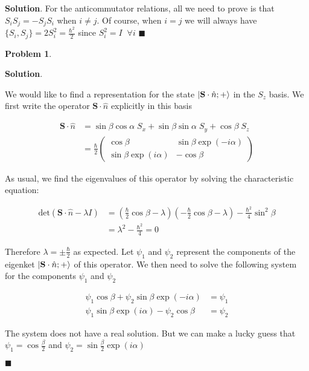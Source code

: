 \documentclass[12pt]{article}
\newtheorem{p}{Problem}
\theoremstyle{definition}
\newenvironment{s}{%
        \begin{trivlist} \item \textbf{Solution}. }{%
            \hspace*{\fill} $\blacksquare$\end{trivlist}}%
\begin{document}
{\begin{s}
For the anticommutator relations, all we need to prove is that $S_{i}S_{j} = -S_{j}S_{i}$ when $i\neq j$. Of course, when $i=j$ we will always have $\{S_{i},S_{j}\} = 2S_{i}^{2} = \frac{\hbar^{2}}{2}$ since $S_{i}^{2} = I \;\;\forall i$
\end{s}

\begin{p}

\end{p}

\begin{s} 

We would like to find a representation for the state $\ket{\mathbf{S}\cdot\hat{n}; +}$ in the $S_{z}$ basis. We first write the operator $\mathbf{S}\cdot\hat{n}$ explicitly in this basis

\begin{align*}
\mathbf{S}\cdot\hat{n} &= \sin\beta\cos\alpha \; S_{x} +\sin\beta\sin\alpha\;S_{y} + \cos\beta\; S_{z}\\
&= \frac{\hbar}{2}\begin{pmatrix}
\cos\beta & \sin\beta\exp(-i\alpha)\\
\sin\beta\exp(i\alpha) & -\cos\beta
\end{pmatrix}
\end{align*}

As usual, we find the eigenvalues of this operator by solving the characteristic equation:

\begin{align*}
\mathrm{det}\left(\mathbf{S}\cdot\hat{n} - \lambda I\right) &= \left(\frac{\hbar}{2}\cos\beta - \lambda\right)\left(-\frac{\hbar}{2}\cos\beta - \lambda\right) - \frac{\hbar^{2}}{4}\sin^{2}\beta\\
&= \lambda^{2} - \frac{\hbar^{2}}{4} = 0
\end{align*}

Therefore $\lambda = \pm \frac{\hbar}{2}$ as expected. Let $\psi_{1}$ and $\psi_{2}$ represent the components of the eigenket $\ket{\mathbf{S}\cdot\hat{n}; +}$ of this operator. We then need to solve the following system for the components $\psi_{1}$ and $\psi_{2}$

\begin{align*}
\psi_{1}\cos\beta+\psi_{2}\sin\beta\exp(-i\alpha) &= \psi_{1}\\
\psi_{1}\sin\beta\exp(i\alpha) - \psi_{2}\cos\beta &= \psi_{2}
\end{align*}

The system does not have a real solution. But we can make a lucky guess that $\psi_{1} = \cos\frac{\beta}{2}$ and $\psi_{2} = \sin\frac{\beta}{2}\exp(i\alpha)$


\end{s}
\end{document}
